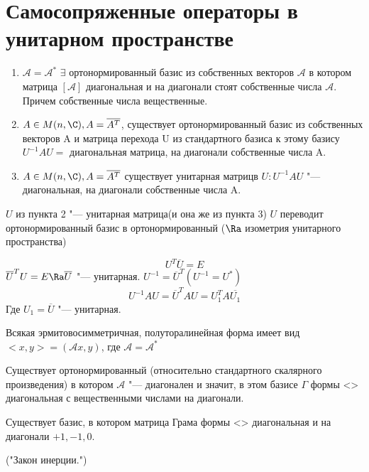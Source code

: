 \section{Самосопряженные операторы в унитарном пространстве}

\begin{enumerate}
    \item $\mathscr{A} = \mathscr{A}^*$ $\exists$ ортонормированный базис из собственных векторов $\mathscr{A}$ в котором
    матрица $[\mathscr{A}]$ диагональная и на диагонали стоят собственные числа $\mathscr{A}$. Причем собственные числа вещественные. 
    \item $A \in M(n, \C), A = \overline{A^T}$, существует ортонормированный базис из собственных векторов A и 
    матрица перехода U из стандартного базиса к этому базису $U^{-1} A U = $ диагональная матрица, на диагонали собственные числа A.
    \item $A \in M(n, \C), A = \overline{A^T}$ существует унитарная матрицв $U\colon U^{-1}AU$ "--- диагональная, на диагонали собственные числа A. 
\end{enumerate}
\begin{Rem}
   $U$ из пункта 2 "--- унитарная матрица(и она же из пункта 3)
   $U$ переводит ортонормированный базис в ортонормированный ($\Ra$ изометрия унитарного пространства)
   
   $$U^T \overline{U} = E$$
   $\overline{U}^T U = E \Ra \overline{U}$ "--- унитарная.
   $U^{-1} = \overline{U}^T (U^{-1} = U^*)$
   $$U^{-1}AU = \overline{U}^T A U = U_1^T A \overline{U_1}$$ 
   Где $U_1 = \overline{U}$ "--- унитарная. 
\end{Rem}

Всякая эрмитовосимметричная, полуторалинейная форма имеет вид $<x, y> = (\mathscr{A}x, y)$, где $\mathscr{A} = \mathscr{A}^*$

\begin{conseq}
Существует ортонормированный (относительно стандартного скалярного произведения) в котором $\mathscr{A}$ "--- диагонален
и значит, в этом базисе $\Gamma$ формы <> диагональная с вещественными числами на диагонали.  
\end{conseq}
\begin{conseq}
Существует базис, в котором матрица Грама формы <> диагональная и на диагонали $+1, -1, 0$.

("Закон инерции.")
\end{conseq}

